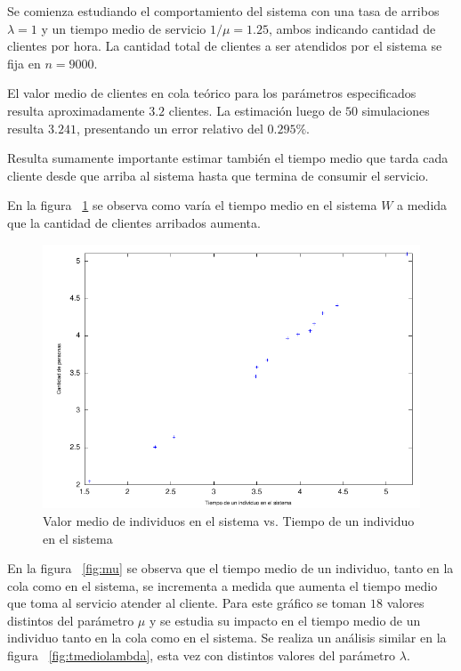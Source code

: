 \documentclass{sig-alternate}
\begin{document}
Se comienza estudiando el comportamiento del sistema con una tasa de arribos
$\lambda = 1$ y un tiempo medio de servicio $1/\mu = 1.25$, ambos indicando
cantidad de clientes por hora.
La cantidad total de clientes a ser atendidos por el sistema se fija en $n=9000$.


El valor medio de clientes en cola te\'{o}rico para los par\'{a}metros
especificados resulta aproximadamente $3.2$ clientes. La estimaci\'{o}n luego
de $50$ simulaciones resulta $3.241$, presentando un error relativo del
$0.295\%$.


Resulta sumamente importante estimar tambi\'{e}n el tiempo medio que tarda
cada cliente desde que arriba al sistema hasta que termina de consumir el
servicio. 


En la figura ~\ref{fig:LvsW} se observa como var\'{i}a el tiempo medio en el sistema
$W$ a medida que la cantidad de clientes arribados aumenta.

\begin{figure}[hp]
\centering
\includegraphics[scale=0.8]{graficos/LvsW}
\caption{Valor medio de individuos en el sistema  vs. Tiempo de un individuo en el sistema}
\label{fig:LvsW}
\end{figure}

En la figura ~\ref{fig:mu} se observa que el tiempo medio de un individuo,
tanto en la cola como en el sistema, se incrementa a medida que aumenta el tiempo
medio que toma al servicio atender al cliente.
Para este gr\'{a}fico se toman $18$ valores distintos del par\'{a}metro $\mu$ y se
estudia su impacto en el tiempo medio de un individuo tanto en la cola
como en el sistema. Se realiza un an\'{a}lisis similar en la figura ~\ref{fig:tmediolambda},
esta vez con distintos valores del par\'{a}metro $\lambda$.
\end{document}
